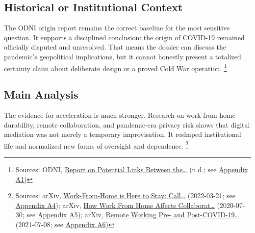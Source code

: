 \documentclass[
  american,
  11pt,
  letterpaper,
]{article}
\begin{document}
\subsection{Historical or Institutional
Context}\label{historical-or-institutional-context-3}

The ODNI origin report remains the correct baseline for the most
sensitive question. It supports a disciplined conclusion: the origin of
COVID-19 remained officially disputed and unresolved. That means the
dossier can discuss the pandemic's geopolitical implications, but it
cannot honestly present a totalized certainty claim about deliberate
design or a proved Cold War operation. \footnote{Sources: ODNI,
  \href{https://www.dni.gov/files/ODNI/documents/assessments/Report-on-Potential-Links-Between-the-Wuhan-Institute-of-Virology-and-the-Origins-of-COVID-19-20230623.pdf}{Report
  on Potential Links Between the\ldots{}} (n.d.; see
  \hyperref[ch-03-appendix-a1-report-on-potential-links-between-the-wuhan-institute-of-virology-and-the-origins-of-covid-19]{Appendix
  A1})}

\subsection{Main Analysis}\label{main-analysis-3}

The evidence for acceleration is much stronger. Research on
work-from-home durability, remote collaboration, and pandemic-era
privacy risk shows that digital mediation was not merely a temporary
improvisation. It reshaped institutional life and normalized new forms
of oversight and dependence. \footnote{Sources: arXiv,
  \href{https://arxiv.org/abs/2203.11136}{Work-From-Home is Here to
  Stay: Call\ldots{}} (2022-03-21; see
  \hyperref[ch-03-appendix-a4-work-from-home-is-here-to-stay-call-for-flexibility-in-post-pandemic-work-policies]{Appendix
  A4}); arXiv, \href{https://arxiv.org/abs/2007.15584}{How Work From
  Home Affects Collaborat\ldots{}} (2020-07-30; see
  \hyperref[ch-03-appendix-a5-how-work-from-home-affects-collaboration-a-large-scale-study-of-information-workers-in-a-natural-experiment-during-covid-19]{Appendix
  A5}); arXiv, \href{https://arxiv.org/abs/2107.03907}{Remote Working
  Pre- and Post-COVID-19\ldots{}} (2021-07-08; see
  \hyperref[ch-03-appendix-a6-remote-working-pre-and-post-covid-19-an-analysis-of-new-threats-and-risks-to-security-and-privacy]{Appendix
  A6})}
\end{document}
